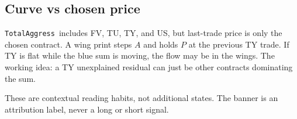 \documentclass[11pt]{article}
\newcommand{\TotalAggress}{\texttt{TotalAggress}}
\begin{document}
\subsection{Curve vs chosen price}

\TotalAggress\ includes FV, TU, TY, and US, but last-trade price is only the chosen contract. A wing print steps $A$ and holds $P$ at the previous TY trade. If TY is flat while the blue sum is moving, the flow may be in the wings. The working idea: a TY unexplained residual can just be other contracts dominating the sum.

These are contextual reading habits, not additional states. The banner is an attribution label, never a long or short signal.
\end{document}
